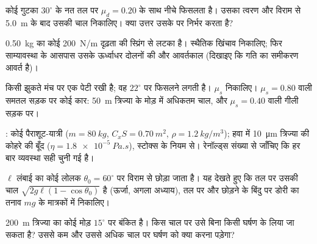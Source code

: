 \begin{exercise}[$\star$]\label{exo:b1:newton-dynamics:3}
कोई गुटका $30^\circ$ के नत तल पर $\mu_d = 0.20$ के साथ नीचे फिसलता है।
उसका त्वरण और विराम से \qty{5.0}{m} के बाद उसकी चाल निकालिए। क्या उत्तर
उसके  पर निर्भर करता है?
\end{exercise}

\begin{exercise}[$\star$]\label{exo:b1:newton-dynamics:4}
\qty{0.50}{kg} का कोई  \qty{200}{N/m} दृढ़ता की स्प्रिंग से लटका
है। स्थैतिक खिंचाव निकालिए; फिर साम्यावस्था के आसपास उसके ऊर्ध्वाधर दोलनों
की  और आवर्तकाल (दिखाइए कि गति का समीकरण आवर्त है)।
\end{exercise}

\begin{exercise}[$\star\star$]\label{exo:b1:newton-dynamics:5}
किसी झुकते मंच पर एक पेटी रखी है; वह $22^\circ$ पर फिसलने लगती है।
$\mu_s$ निकालिए। $\mu_s = 0.80$ वाली समतल सड़क पर कोई कार: \qty{50}{m}
त्रिज्या के मोड़ में अधिकतम चाल, और $\mu_s = 0.40$ वाली गीली सड़क पर।
\end{exercise}

\begin{exercise}[$\star\star$]\label{exo:b1:newton-dynamics:6}
: कोई पैराशूट-यात्री ($m = \qty{80}{kg}$, $C_xS = \qty{0.70}{m^2}$,
$\rho = \qty{1.2}{kg/m^3}$); हवा में \qty{10}{\micro m} त्रिज्या की कोहरे की
बूँद ($\eta = \qty{1.8e-5}{Pa.s}$), स्टोक्स के नियम से। रेनॉल्ड्स संख्या से
जाँचिए कि हर बार व्यवस्था सही चुनी गई है।
\end{exercise}

\begin{exercise}[$\star\star$]\label{exo:b1:newton-dynamics:7}
$\ell$ लंबाई का कोई लोलक $\theta_0 = 60^\circ$ पर विराम से छोड़ा जाता है।
यह देखते हुए कि तल पर उसकी चाल $\sqrt{2g\ell(1 - \cos\theta_0)}$ है
(ऊर्जा, अगला अध्याय), तल पर और छोड़ने के बिंदु पर डोरी का तनाव $mg$ के
मात्रकों में निकालिए।
\end{exercise}

\begin{exercise}[$\star\star$]\label{exo:b1:newton-dynamics:8}
\qty{200}{m} त्रिज्या का कोई मोड़ $15^\circ$ पर बंकित है। किस चाल पर उसे
बिना किसी घर्षण के लिया जा सकता है? उससे कम और उससे अधिक चाल पर घर्षण को
क्या करना पड़ेगा?
\end{exercise}

